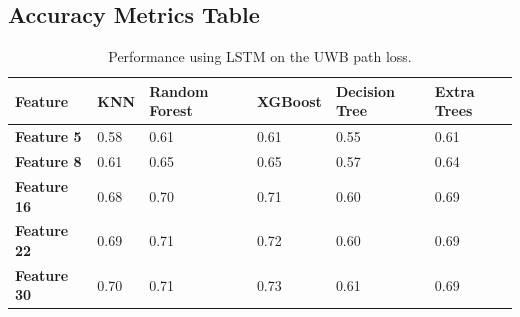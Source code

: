 \documentclass{IEEE_lsens}
\begin{document}
\subsection{Accuracy Metrics Table}
\begin{table}[t!]
\centering
\caption{\scriptsize Performance using LSTM on the UWB path loss.}\label{tab:tab4}
\vspace{-0.2cm}
\begin{tabular}{|m{0.7677598in}|m{0.41085985in}|m{1.0830599in}|m{0.66565984in}|m{0.9497598in}|m{0.8309598in}|}
\hline
{\bfseries Feature} &
{\bfseries KNN} &
{\bfseries Random Forest} &
{\bfseries XGBoost} &
{\bfseries Decision Tree} &
{\bfseries Extra Trees}\\\hline
{\bfseries Feature 5} &
0.58 &
0.61 &
0.61 &
0.55 &
0.61\\\hline
{\bfseries Feature 8} &
0.61 &
0.65 &
0.65 &
0.57 &
0.64\\\hline
{\bfseries Feature 16} &
0.68 &
0.70 &
0.71 &
0.60 &
0.69\\\hline
{\bfseries Feature 22} &
0.69 &
0.71 &
0.72 &
0.60 &
0.69\\\hline
{\bfseries Feature 30} &
0.70 &
0.71 &
0.73 &
0.61 &
0.69\\\hline
\end{tabular}
\end{table}
\end{document}
